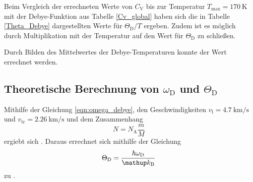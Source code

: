 Beim Vergleich der errechneten Werte von $C_\mathrm{V}$ bis zur Temperatur $T_\text{max} = \SI{170}{\kelvin}$ mit der Debye-Funktion aus Tabelle \ref{Cv_global} haben sich die in Tabelle \ref{Theta_Debye} dargestellten Werte für $\Theta_\text{D} / T$ ergeben.
Zudem ist es möglich durch Multiplikation mit der Temperatur auf den Wert für $\Theta_\text{D}$ zu schließen.

Durch Bilden des Mittelwertes der Debye-Temperaturen konnte der Wert  errechnet werden.
\FloatBarrier
\subsection{Theoretische Berechnung von $\omega_\mathrm{D}$ und $\Theta_\mathrm{D}$} %
\label{sub:theoretische_berechnung_von_omega_mathrm}

Mithilfe der Gleichung \eqref{eqn:omega_debye}, den Geschwindigkeiten $v_\text{l}=\SI{4.7}{\kilo\meter\per\second}$ und $v_\text{tr}=\SI{2.26}{\kilo\meter\per\second}$ und dem Zusammenhang
\begin{equation*}
	N = N_\text{A} \frac{m}{M}
\end{equation*}
ergiebt sich .
Daraus errechnet sich mithilfe der Gleichung
\begin{equation*}
	\Theta_\text{D} = \frac{\hbar \omega_\text{D}}{\kb}
\end{equation*}
zu .